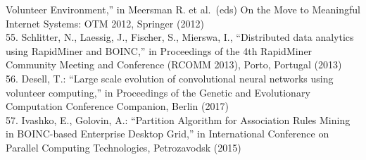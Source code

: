 \documentclass[
]{article}
\begin{document}
Volunteer Environment,'' in Meersman R. et al.~(eds) On the Move to
Meaningful Internet Systems: OTM 2012, Springer (2012)\\
55. Schlitter, N., Laessig, J., Fischer, S., Mierswa, I., ``Distributed
data analytics using RapidMiner and BOINC,'' in Proceedings of the 4th
RapidMiner Community Meeting and Conference (RCOMM 2013), Porto,
Portugal (2013)\\
56. Desell, T.: ``Large scale evolution of convolutional neural networks
using volunteer computing,'' in Proceedings of the Genetic and
Evolutionary Computation Conference Companion, Berlin (2017)\\
57. Ivashko, E., Golovin, A.: ``Partition Algorithm for Association
Rules Mining in BOINC-based Enterprise Desktop Grid,'' in International
Conference on Parallel Computing Technologies, Petrozavodsk (2015)
\end{document}
